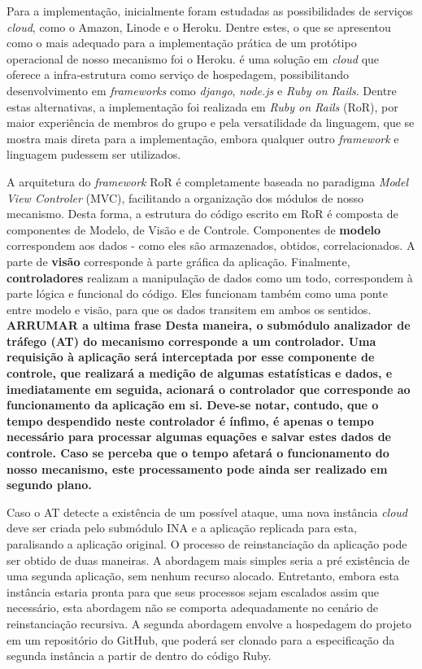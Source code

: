 Para a implementação, inicialmente foram estudadas as possibilidades de serviços \emph{cloud}, como o Amazon, Linode e o Heroku. Dentre estes, o que se apresentou como o mais adequado para a implementação prática de um protótipo operacional de nosso mecanismo foi o Heroku. \cite{heroku} é uma solução em \emph{cloud} que oferece a infra-estrutura como serviço de hospedagem, possibilitando desenvolvimento em \emph{frameworks} como \emph{django}, \emph{node.js} e \emph{Ruby on Rails}. Dentre estas alternativas, a implementação foi realizada em \emph{Ruby on Rails} (RoR), por maior experiência de membros do grupo e pela versatilidade da linguagem, que se mostra mais direta para a implementação, embora qualquer outro \emph{framework} e linguagem pudessem ser utilizados.

A arquitetura do \emph{framework} RoR é completamente baseada no paradigma \emph{Model View Controler} (MVC), facilitando a organização dos módulos de nosso mecanismo. Desta forma, a estrutura do código escrito em RoR é composta de componentes de Modelo, de Visão e de Controle. Componentes de \textbf{modelo} correspondem aos dados - como eles são armazenados, obtidos, correlacionados. A parte de \textbf{visão} corresponde à parte gráfica da aplicação. Finalmente, \textbf{controladores} realizam a manipulação de dados como um todo, correspondem à parte lógica e funcional do código. Eles funcionam também como uma ponte entre modelo e visão, para que os dados transitem em ambos os sentidos.\\
\textbf{ARRUMAR a ultima frase
Desta maneira, o submódulo analizador de tráfego (AT) do mecanismo corresponde a um controlador. Uma requisição à aplicação será interceptada por esse componente de controle, que realizará a medição de algumas estatísticas e dados, e imediatamente em seguida, acionará o controlador que corresponde ao funcionamento da aplicação em si. Deve-se notar, contudo, que o tempo despendido neste controlador é ínfimo, é apenas o tempo necessário para processar algumas equações e salvar estes dados de controle. Caso se perceba que o tempo afetará o funcionamento do nosso mecanismo, este processamento pode ainda ser realizado em segundo plano.}

Caso o AT detecte a existência de um possível ataque, uma nova instância \emph{cloud} deve ser criada pelo submódulo INA e a aplicação replicada para esta, paralisando a aplicação original. O processo de reinstanciação da aplicação pode ser obtido de duas maneiras. A abordagem mais simples seria a pré existência de uma segunda aplicação, sem nenhum recurso alocado. Entretanto, embora esta instância estaria pronta para que seus processos sejam escalados assim que necessário, esta abordagem não se comporta adequadamente no cenário de reinstanciação recursiva. A segunda abordagem envolve a hospedagem do projeto em um repositório do GitHub, que poderá ser clonado para a especificação da segunda instância a partir de dentro do código Ruby. 

